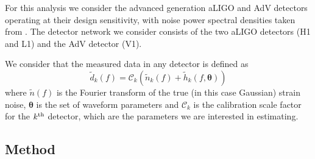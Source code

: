 \documentclass[prd, twocolumn, lengthcheck, superscriptaddress, showpacs, letterpaper, nofootinbib]{revtex4-1}
\newcommand{\gws}{\tilde{h}}
\newcommand{\scf}{\ensuremath{\mathcal{C}}}
\newcommand{\btheta}{\bm{\theta}}
\begin{document}
For this analysis we consider the advanced generation \ac{aLIGO} and
\ac{AdV} detectors operating at their design sensitivity, with noise power
spectral densities taken from \cite{2013arXiv1304.0670L}. The detector network
we consider consists of the two \ac{aLIGO} detectors (H1 and L1) and 
the \ac{AdV} detector (V1). 

We consider that the measured data in any detector is defined as
%
\begin{equation}
  \tilde{d}_{k}(f)=\scf_{k}(\tilde{n}_{k}(f)+\gws_{k}(f,\btheta))
\end{equation}
%
where $\tilde{n}(f)$ is the Fourier transform of the true (in this case
Gaussian) strain noise, $\btheta$ is the set of waveform parameters and
$\scf_k$ is the calibration scale factor for the $k^{\rm th}$ detector, which are the
parameters we are interested in estimating.

\subsection{Method}
\end{document}
